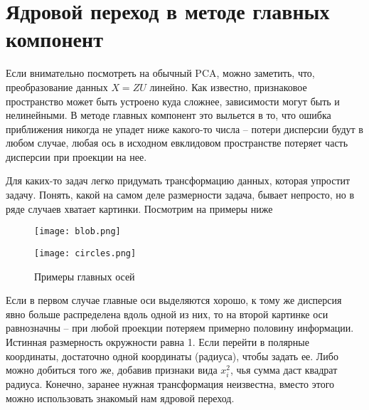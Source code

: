 \documentclass[12pt,fleqn]{article}
\begin{document}
    
    
    
    
    


\section{Ядровой переход в методе главных компонент}

Если внимательно посмотреть на обычный PCA, можно заметить, что, преобразование данных $X=ZU$ линейно. Как известно, признаковое пространство может быть устроено куда сложнее, зависимости могут быть и нелинейными. В методе главных компонент это выльется в то, что ошибка приближения никогда не упадет ниже какого-то числа -- потери дисперсии будут в любом случае, любая ось в исходном евклидовом пространстве потеряет часть дисперсии при проекции на нее.

Для каких-то задач легко придумать трансформацию данных, которая упростит задачу. Понять, какой на самом деле размерности задача, бывает непросто, но в ряде случаев хватает картинки. Посмотрим на примеры ниже

\pagebreak

\begin{figure}
\centering
\begin{minipage}{0.5\textwidth}
  \centering
  \texttt{[image: blob.png]}
  \label{fig:sub1}
\end{minipage}%
\begin{minipage}{0.5\textwidth}
  \centering
  \texttt{[image: circles.png]}
  \label{fig:sub2}
\end{minipage}
\caption{Примеры главных осей}
\label{fig:test}
\end{figure}

Если в первом случае главные оси выделяются хорошо, к тому же дисперсия явно больше распределена вдоль одной из них, то на второй картинке оси равнозначны -- при любой проекции потеряем примерно половину информации. Истинная размерность окружности равна 1. Если перейти в полярные координаты, достаточно одной координаты (радиуса), чтобы задать ее. Либо можно добиться того же, добавив признаки вида $x_i^2$, чья сумма даст квадрат радиуса. Конечно, заранее нужная трансформация неизвестна, вместо этого можно использовать знакомый нам ядровой переход.
\end{document}
